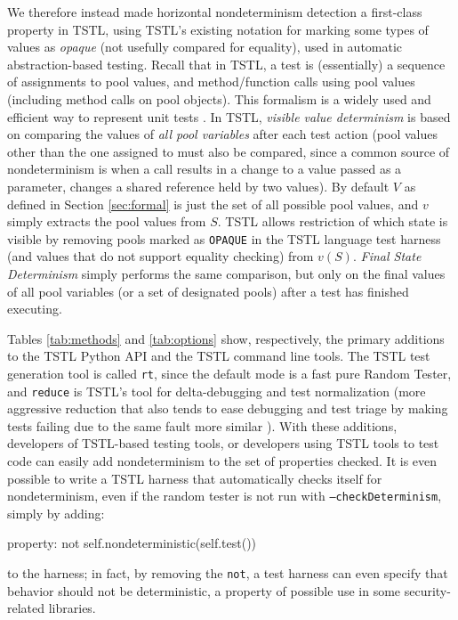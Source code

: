 We therefore instead made horizontal nondeterminism detection a first-class
property in TSTL, using TSTL's existing notation for marking some
types of values as \emph{opaque} (not usefully compared for equality),
used in automatic abstraction-based testing.  Recall that in TSTL, a
test is (essentially) a sequence of assignments to pool values,
and method/function calls using pool values (including method calls on
pool objects).  This formalism is a widely used and efficient way to
represent unit tests \cite{Pacheco,AndrewsTR}.  In TSTL, \emph{visible
value determinism} is based on comparing the values of \emph{all pool
variables} after each test action (pool values other than the one
assigned to must also be compared, since a common source of
nondeterminism is when a call results in a change to a value passed as
a parameter, changes a shared reference held by two values).  By
default $V$ as defined in Section \ref{sec:formal} is just the set of all possible pool values, and $v$
simply extracts the pool values from $S$.
TSTL allows restriction of which state is visible by removing pools marked as {\tt OPAQUE} in the
TSTL language test harness (and values that do not support equality
checking) from $v(S)$.  \emph{Final State Determinism} simply performs the same
comparison, but only on the final values of all pool variables (or a
set of designated pools) after a test has
finished executing.

 Tables \ref{tab:methods}
and \ref{tab:options} show, respectively, the primary additions to the
TSTL Python API and the TSTL command line tools.  The TSTL test
generation tool is called {\tt rt}, since the default mode is a fast
pure Random Tester, and {\tt reduce} is TSTL's tool for
delta-debugging and test
normalization (more aggressive reduction that also tends to ease
debugging and test triage by making tests failing due to the same
fault more similar \cite{onetest}).  With these additions,
developers of TSTL-based testing tools, or developers using TSTL tools
to test code can easily add nondeterminism to the set of properties
checked.  It is even possible to write a TSTL harness that
automatically checks itself for nondeterminism, even if the random
tester is not run with {\tt --checkDeterminism}, simply by adding:

{\scriptsize
\begin{code}
property: not self.nondeterministic(self.test())
\end{code}
}

\noindent to the harness; in fact, by removing the {\tt not}, a test harness can
even specify that behavior should not be deterministic, a property of
possible use in some security-related libraries.

